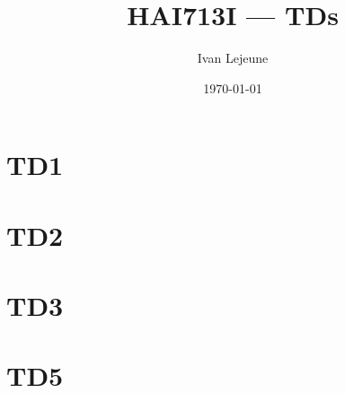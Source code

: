 \documentclass[french,a4paper,10pt]{article}
\title{\color{astral} \sffamily \bfseries HAI713I --- TDs}
\author{Ivan Lejeune}
\date{\today}
\begin{document}
    \maketitle
    \tableofcontents

    \newpage
    \section{TD1}\label{sec:TD1}
    \setcounter{tdcounter}{0}
    

    \newpage
    \section{TD2}\label{sec:TD2}
    \setcounter{tdcounter}{0}
    

    \newpage
    \section{TD3}\label{sec:TD3}
    \setcounter{tdcounter}{0}
    

    \newpage
    \section{TD5}\label{sec:TD5}
    \setcounter{tdcounter}{0}
    
\end{document}
